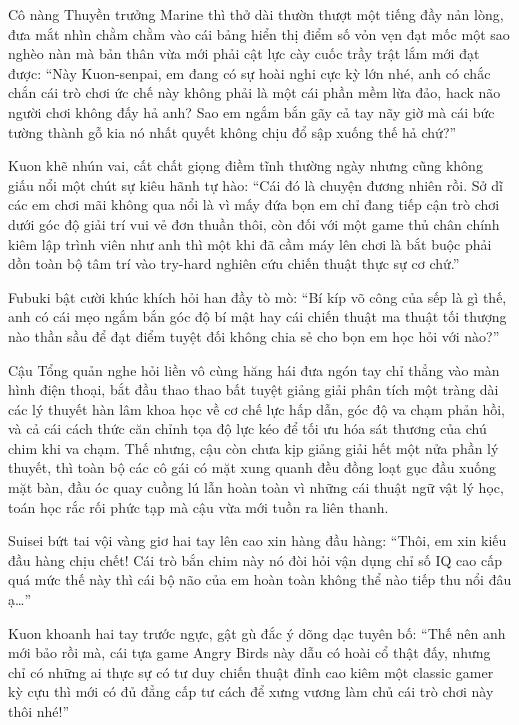 \documentclass[../main.tex]{subfiles}
\begin{document}
Cô nàng Thuyền trưởng Marine thì thở dài thườn thượt một tiếng đầy nản lòng, đưa mắt nhìn chằm chằm vào cái bảng hiển thị điểm số vỏn vẹn đạt mốc một sao nghèo nàn mà bản thân vừa mới phải cật lực cày cuốc trầy trật lắm mới đạt được: ``Này Kuon-senpai, em đang có sự hoài nghi cực kỳ lớn nhé, anh có chắc chắn cái trò chơi ức chế này không phải là một cái phần mềm lừa đảo, hack não người chơi không đấy hả anh? Sao em ngắm bắn gãy cả tay nãy giờ mà cái bức tường thành gỗ kia nó nhất quyết không chịu đổ sập xuống thế hả chứ?''

Kuon khẽ nhún vai, cất chất giọng điềm tĩnh thường ngày nhưng cũng không giấu nổi một chút sự kiêu hãnh tự hào: ``Cái đó là chuyện đương nhiên rồi. Sở dĩ các em chơi mãi không qua nổi là vì mấy đứa bọn em chỉ đang tiếp cận trò chơi dưới góc độ giải trí vui vẻ đơn thuần thôi, còn đối với một game thủ chân chính kiêm lập trình viên như anh thì một khi đã cầm máy lên chơi là bắt buộc phải dồn toàn bộ tâm trí vào try-hard nghiên cứu chiến thuật thực sự cơ chứ.''

Fubuki bật cười khúc khích hỏi han đầy tò mò: ``Bí kíp võ công của sếp là gì thế, anh có cái mẹo ngắm bắn góc độ bí mật hay cái chiến thuật ma thuật tối thượng nào thần sầu để đạt điểm tuyệt đối không chia sẻ cho bọn em học hỏi với nào?''

Cậu Tổng quản nghe hỏi liền vô cùng hăng hái đưa ngón tay chỉ thẳng vào màn hình điện thoại, bắt đầu thao thao bất tuyệt giảng giải phân tích một tràng dài các lý thuyết hàn lâm khoa học về cơ chế lực hấp dẫn, góc độ va chạm phản hồi, và cả cái cách thức căn chỉnh tọa độ lực kéo để tối ưu hóa sát thương của chú chim khi va chạm. Thế nhưng, cậu còn chưa kịp giảng giải hết một nửa phần lý thuyết, thì toàn bộ các cô gái có mặt xung quanh đều đồng loạt gục đầu xuống mặt bàn, đầu óc quay cuồng lú lẫn hoàn toàn vì những cái thuật ngữ vật lý học, toán học rắc rối phức tạp mà cậu vừa mới tuồn ra liên thanh.

Suisei bứt tai vội vàng giơ hai tay lên cao xin hàng đầu hàng: ``Thôi, em xin kiếu đầu hàng chịu chết! Cái trò bắn chim này nó đòi hỏi vận dụng chỉ số IQ cao cấp quá mức thế này thì cái bộ não của em hoàn toàn không thể nào tiếp thu nổi đâu ạ\dots''

Kuon khoanh hai tay trước ngực, gật gù đắc ý dõng dạc tuyên bố: ``Thế nên anh mới bảo rồi mà, cái tựa game Angry Birds này dẫu có hoài cổ thật đấy, nhưng chỉ có những ai thực sự có tư duy chiến thuật đỉnh cao kiêm một classic gamer kỳ cựu thì mới có đủ đẳng cấp tư cách để xưng vương làm chủ cái trò chơi này thôi nhé!''
\end{document}
